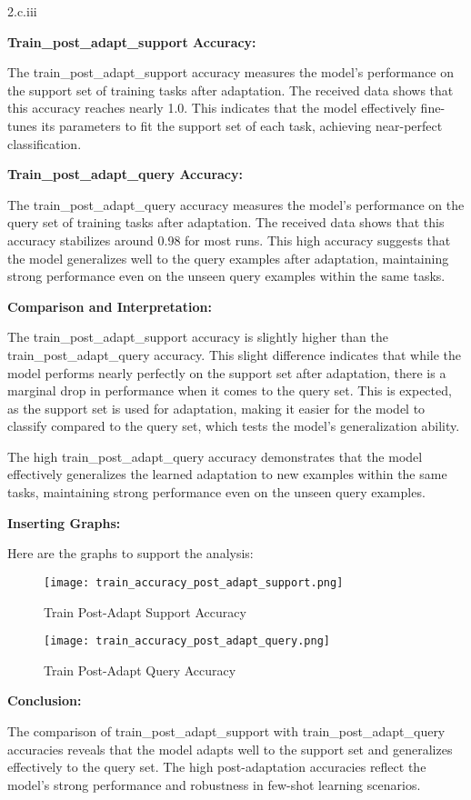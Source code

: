 \LARGE
2.c.iii
\normalsize

\begin{answer}
    \textbf{Train\_post\_adapt\_support Accuracy:}

The train\_post\_adapt\_support accuracy measures the model's performance on the support set of training tasks after adaptation. The received data shows that this accuracy reaches nearly 1.0. This indicates that the model effectively fine-tunes its parameters to fit the support set of each task, achieving near-perfect classification.

\textbf{Train\_post\_adapt\_query Accuracy:}

The train\_post\_adapt\_query accuracy measures the model's performance on the query set of training tasks after adaptation. The received data shows that this accuracy stabilizes around 0.98 for most runs. This high accuracy suggests that the model generalizes well to the query examples after adaptation, maintaining strong performance even on the unseen query examples within the same tasks.

\textbf{Comparison and Interpretation:}

The train\_post\_adapt\_support accuracy is slightly higher than the train\_post\_adapt\_query accuracy. This slight difference indicates that while the model performs nearly perfectly on the support set after adaptation, there is a marginal drop in performance when it comes to the query set. This is expected, as the support set is used for adaptation, making it easier for the model to classify compared to the query set, which tests the model's generalization ability.

The high train\_post\_adapt\_query accuracy demonstrates that the model effectively generalizes the learned adaptation to new examples within the same tasks, maintaining strong performance even on the unseen query examples.

\textbf{Inserting Graphs:}

Here are the graphs to support the analysis:

\begin{figure}[ht]
    \centering
    \texttt{[image: train\_accuracy\_post\_adapt\_support.png]}
    \caption{Train Post-Adapt Support Accuracy}
    \label{fig:train_post_adapt_support}
\end{figure}

\begin{figure}[ht]
    \centering
    \texttt{[image: train\_accuracy\_post\_adapt\_query.png]}
    \caption{Train Post-Adapt Query Accuracy}
    \label{fig:train_post_adapt_query}
\end{figure}

\textbf{Conclusion:}

The comparison of train\_post\_adapt\_support with train\_post\_adapt\_query accuracies reveals that the model adapts well to the support set and generalizes effectively to the query set. The high post-adaptation accuracies reflect the model's strong performance and robustness in few-shot learning scenarios.

\end{answer}
